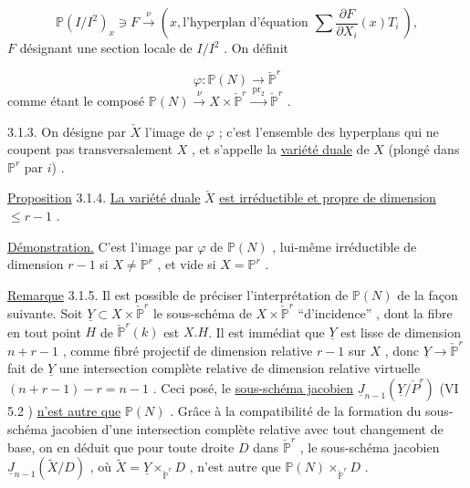 \begin{equation}\tag{3.1.1}
\mathbb{P}(I/I^2)_x \ni F \xrightarrow{\ \nu\ } (x, \text{l'hyperplan d'équation } \sum \frac{\partial F}{\partial X_i}(x)T_i\ ),
\end{equation}
$F$  désignant une section locale de  $I/I^2$  . On définit

\begin{equation}\tag{3.1.2}
\varphi : \mathbb{P}(N) \longrightarrow \check{\mathbb{P}}^r
\end{equation}
comme étant le composé  $\mathbb{P}(N) \xrightarrow{\ \nu\ } X \times \check{\mathbb{P}}^r \xrightarrow{\ \mathrm{pr}_2\ } \check{\mathbb{P}}^r$ .



3.1.3. On désigne par $\check{X}$ l'image de $\varphi$ ; c'est l'ensemble des hyperplans qui ne coupent pas transversalement $X$ , et s'appelle la \underline{variété duale} de $X$ (plongé dans $\mathbb{P}^r$ par $i$) .

\underline{Proposition} 3.1.4. \underline{La variété duale} $\check{X}$ \underline{est irréductible et propre de dimension} $\leq r-1$ .

\underline{Démonstration.} C'est l'image par $\varphi$ de $\mathbb{P}(N)$ , lui-même irréductible de dimension $r-1$ si $X \neq \mathbb{P}^r$ , et vide si $X = \mathbb{P}^r$ .

\underline{Remarque} 3.1.5. Il est possible de préciser l'interprétation de $\mathbb{P}(N)$ de la façon suivante. Soit $\underline{Y} \subset X \times \check{\mathbb{P}}^r$ le sous-schéma de $X \times \check{\mathbb{P}}^r$ ``d'incidence'' , dont la fibre en tout point $H$ de $\check{\mathbb{P}}^r(k)$ est $X.H$. Il est immédiat que $\underline{Y}$ est lisse de dimension $n+r-1$ , comme fibré projectif de dimension relative $r-1$ sur $X$ , donc $\underline{Y} \longrightarrow \check{\mathbb{P}}^r$ fait de $\underline{Y}$ une intersection complète relative de dimension relative virtuelle $(n+r-1)-r = n-1$ . Ceci posé, le \underline{sous-schéma jacobien} $\underline{J}_{n-1}(\underline{Y}/\check{P}^r)$ (VI 5.2 ) \underline{n'est autre que} $\mathbb{P}(N)$ . Grâce à la compatibilité de la formation du sous-schéma jacobien d'une intersection complète relative avec tout changement de base, on en déduit que pour toute droite $D$ dans $\check{\mathbb{P}}^r$ , le sous-schéma jacobien $\underline{J}_{n-1}(\tilde{X}/D)$ , où $\tilde{X} = \underline{Y} \times_{\check{\mathbb{P}}^r} D$ , n'est autre que $\mathbb{P}(N) \times_{\check{\mathbb{P}}^r} D$ .

